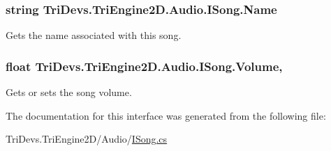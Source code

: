 \hypertarget{interface_tri_devs_1_1_tri_engine2_d_1_1_audio_1_1_i_song_ad14836f818a4e0d63c9a341c2159250a}{
\subsubsection[{Name}]{\setlength{\rightskip}{0pt plus 5cm}string Tri\-Devs.\-Tri\-Engine2\-D.\-Audio.\-I\-Song.\-Name\hspace{0.3cm}{\ttfamily [get]}}}\label{interface_tri_devs_1_1_tri_engine2_d_1_1_audio_1_1_i_song_ad14836f818a4e0d63c9a341c2159250a}


Gets the name associated with this song. 

\hypertarget{interface_tri_devs_1_1_tri_engine2_d_1_1_audio_1_1_i_song_aaf0addd47d248155a74d9cb9eca8fa4b}{
\subsubsection[{Volume}]{\setlength{\rightskip}{0pt plus 5cm}float Tri\-Devs.\-Tri\-Engine2\-D.\-Audio.\-I\-Song.\-Volume\hspace{0.3cm}{\ttfamily [get]}, {\ttfamily [set]}}}\label{interface_tri_devs_1_1_tri_engine2_d_1_1_audio_1_1_i_song_aaf0addd47d248155a74d9cb9eca8fa4b}


Gets or sets the song volume. 



The documentation for this interface was generated from the following file\-:\begin{DoxyCompactItemize}
\item 
Tri\-Devs.\-Tri\-Engine2\-D/\-Audio/\hyperlink{_i_song_8cs}{I\-Song.\-cs}\end{DoxyCompactItemize}
